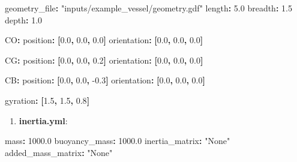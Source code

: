 \documentclass[
  letterpaper,
  DIV=11,
  numbers=noendperiod]{scrreprt}
\newenvironment{Shaded}{\begin{snugshade}}{\end{snugshade}}
\newcommand{\AttributeTok}[1]{\textcolor[rgb]{0.40,0.45,0.13}{#1}}
\newcommand{\FloatTok}[1]{\textcolor[rgb]{0.68,0.00,0.00}{#1}}
\newcommand{\FunctionTok}[1]{\textcolor[rgb]{0.28,0.35,0.67}{#1}}
\newcommand{\KeywordTok}[1]{\textcolor[rgb]{0.00,0.23,0.31}{\textbf{#1}}}
\newcommand{\StringTok}[1]{\textcolor[rgb]{0.13,0.47,0.30}{#1}}
\providecommand{\tightlist}{%
  \setlength{\itemsep}{0pt}\setlength{\parskip}{0pt}}\usepackage{longtable,booktabs,array}
\begin{document}
\begin{Shaded}
\begin{Highlighting}[]
\FunctionTok{geometry\_file}\KeywordTok{:}\AttributeTok{ }\StringTok{"inputs/example\_vessel/geometry.gdf"}
\FunctionTok{length}\KeywordTok{:}\AttributeTok{ }\FloatTok{5.0}
\FunctionTok{breadth}\KeywordTok{:}\AttributeTok{ }\FloatTok{1.5}
\FunctionTok{depth}\KeywordTok{:}\AttributeTok{ }\FloatTok{1.0}

\FunctionTok{CO}\KeywordTok{:}
\AttributeTok{  }\FunctionTok{position}\KeywordTok{:}\AttributeTok{ }\KeywordTok{[}\FloatTok{0.0}\KeywordTok{,}\AttributeTok{ }\FloatTok{0.0}\KeywordTok{,}\AttributeTok{ }\FloatTok{0.0}\KeywordTok{]}
\AttributeTok{  }\FunctionTok{orientation}\KeywordTok{:}\AttributeTok{ }\KeywordTok{[}\FloatTok{0.0}\KeywordTok{,}\AttributeTok{ }\FloatTok{0.0}\KeywordTok{,}\AttributeTok{ }\FloatTok{0.0}\KeywordTok{]}

\FunctionTok{CG}\KeywordTok{:}
\AttributeTok{  }\FunctionTok{position}\KeywordTok{:}\AttributeTok{ }\KeywordTok{[}\FloatTok{0.0}\KeywordTok{,}\AttributeTok{ }\FloatTok{0.0}\KeywordTok{,}\AttributeTok{ }\FloatTok{0.2}\KeywordTok{]}
\AttributeTok{  }\FunctionTok{orientation}\KeywordTok{:}\AttributeTok{ }\KeywordTok{[}\FloatTok{0.0}\KeywordTok{,}\AttributeTok{ }\FloatTok{0.0}\KeywordTok{,}\AttributeTok{ }\FloatTok{0.0}\KeywordTok{]}

\FunctionTok{CB}\KeywordTok{:}
\AttributeTok{  }\FunctionTok{position}\KeywordTok{:}\AttributeTok{ }\KeywordTok{[}\FloatTok{0.0}\KeywordTok{,}\AttributeTok{ }\FloatTok{0.0}\KeywordTok{,}\AttributeTok{ }\FloatTok{{-}0.3}\KeywordTok{]}
\AttributeTok{  }\FunctionTok{orientation}\KeywordTok{:}\AttributeTok{ }\KeywordTok{[}\FloatTok{0.0}\KeywordTok{,}\AttributeTok{ }\FloatTok{0.0}\KeywordTok{,}\AttributeTok{ }\FloatTok{0.0}\KeywordTok{]}

\FunctionTok{gyration}\KeywordTok{:}\AttributeTok{ }\KeywordTok{[}\FloatTok{1.5}\KeywordTok{,}\AttributeTok{ }\FloatTok{1.5}\KeywordTok{,}\AttributeTok{ }\FloatTok{0.8}\KeywordTok{]}
\end{Highlighting}
\end{Shaded}

\begin{enumerate}
\def\labelenumi{\arabic{enumi}.}
\setcounter{enumi}{2}
\tightlist
\item
  \textbf{inertia.yml}:
\end{enumerate}

\begin{Shaded}
\begin{Highlighting}[]
\FunctionTok{mass}\KeywordTok{:}\AttributeTok{ }\FloatTok{1000.0}
\FunctionTok{buoyancy\_mass}\KeywordTok{:}\AttributeTok{ }\FloatTok{1000.0}
\FunctionTok{inertia\_matrix}\KeywordTok{:}\AttributeTok{ }\StringTok{"None"}
\FunctionTok{added\_mass\_matrix}\KeywordTok{:}\AttributeTok{ }\StringTok{"None"}
\end{Highlighting}
\end{Shaded}
\end{document}
